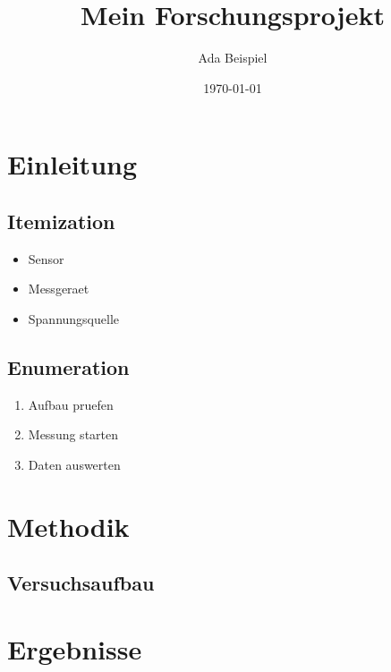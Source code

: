 \documentclass[a4paper,11pt]{article}
\title{Mein Forschungsprojekt}
\author{Ada Beispiel}
\date{\today}
\begin{document}
\maketitle

\section{Einleitung}

\subsection{Itemization}
\begin{itemize}
  \item Sensor
  \item Messgeraet
  \item Spannungsquelle
\end{itemize}

\subsection{Enumeration}
\begin{enumerate}
  \item Aufbau pruefen
  \item Messung starten
  \item Daten auswerten
\end{enumerate}

\section{Methodik}

\subsection{Versuchsaufbau}

\section{Ergebnisse}
\end{document}
